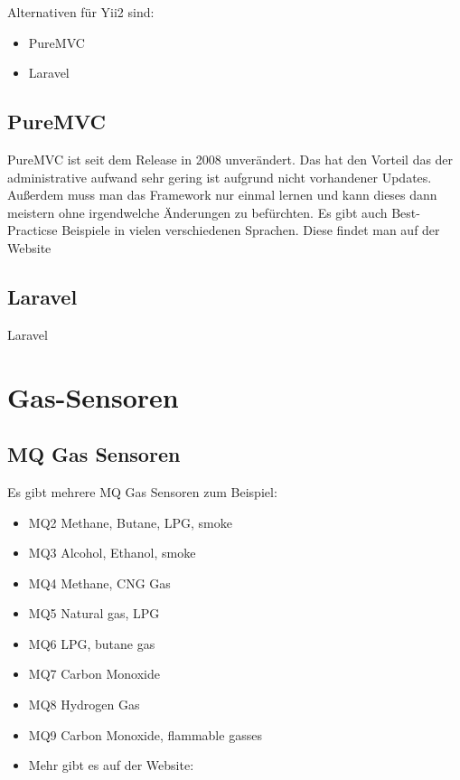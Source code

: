 Alternativen für Yii2 sind:

\begin{itemize}
	\item PureMVC
	\item Laravel
\end{itemize}

\subsection{PureMVC}
PureMVC ist seit dem Release in 2008 unverändert. Das hat den Vorteil das der administrative aufwand sehr gering ist aufgrund nicht vorhandener Updates. Außerdem muss man das Framework nur einmal lernen und kann dieses dann meistern ohne irgendwelche Änderungen zu befürchten.
Es gibt auch Best-Practicse Beispiele in vielen verschiedenen Sprachen. Diese findet man auf der Website \cite{Pure_MVC}

\subsection{Laravel}
Laravel


\newpage
\def \currentAuthor{Kevin Glatz}


\section{Gas-Sensoren}

\subsection{MQ Gas Sensoren}
Es gibt mehrere MQ Gas Sensoren zum Beispiel:

\begin{itemize}
\item {MQ2}
	Methane, Butane, LPG, smoke
\item {MQ3}
	Alcohol, Ethanol, smoke
\item {MQ4}
	Methane, CNG Gas
\item {MQ5}
	Natural gas, LPG
\item {MQ6}
	LPG, butane gas
\item {MQ7}
	Carbon Monoxide
\item {MQ8}
	Hydrogen Gas
\item {MQ9}
	Carbon Monoxide, flammable gasses
\item Mehr gibt es auf der Website: \cite{MQ_Sensoren}
\end{itemize}

